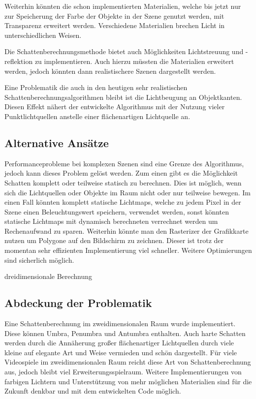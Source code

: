 Weiterhin könnten die schon implementierten Materialien, welche bis jetzt nur zur Speicherung der Farbe der Objekte in der Szene genutzt werden, mit Transparenz erweitert werden. Verschiedene Materialien brechen Licht in unterschiedlichen Weisen.

Die Schattenberechnungsmethode bietet auch Möglichkeiten Lichtstreuung und -reflektion zu implementieren. Auch hierzu müssten die Materialien erweitert werden, jedoch könnten dann realistischere Szenen dargestellt werden.

Eine Problematik die auch in den heutigen sehr realistischen Schattenberechnungsalgorithmen bleibt ist die Lichtbeugung an Objektkanten. Diesen Effekt nähert der entwickelte Algorithmus mit der Nutzung vieler Punktlichtquellen anstelle einer flächenartigen Lichtquelle an.

\subsection{Alternative Ansätze}

Performanceprobleme bei komplexen Szenen sind eine Grenze des Algorithmus, jedoch kann dieses Problem gelöst werden. Zum einen gibt es die Möglichkeit Schatten komplett oder teilweise statisch zu berechnen. Dies ist möglich, wenn sich die Lichtquellen oder Objekte im Raum nicht oder nur teilweise bewegen. Im einen Fall könnten komplett statische Lichtmaps, welche zu jedem Pixel in der Szene einen Beleuchtungswert speichern, verwendet werden, sonst könnten statische Lichtmaps mit dynamisch berechneten verrechnet werden um Rechenaufwand zu sparen. Weiterhin könnte man den Rasterizer der Grafikkarte nutzen um Polygone auf den Bildschirm zu zeichnen. Dieser ist trotz der momentan sehr effizienten Implementierung viel schneller. Weitere Optimierungen sind sicherlich möglich.

dreidimensionale Berechnung

\subsection{Abdeckung der Problematik}

Eine Schattenberechnung im zweidimensionalen Raum wurde implementiert. Diese können Umbra, Penumbra und Antumbra enthalten. Auch harte Schatten werden durch die Annäherung großer flächenartiger Lichtquellen durch viele kleine auf elegante Art und Weise vermieden und schön dargestellt. Für viele Videospiele im zweidimensionalen Raum reicht diese Art von Schattenberechnung aus, jedoch bleibt viel Erweiterungsspielraum. Weitere Implementierungen von farbigen Lichtern und Unterstützung von mehr möglichen Materialien sind für die Zukunft denkbar und mit dem entwickelten Code möglich.